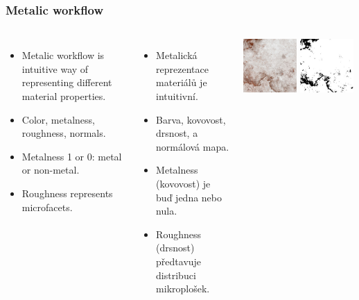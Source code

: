 \begin{frame}\frametitle{Metalic workflow}
  \begin{columns}[c]
    \scriptsize
    \begin{itemize}
      \item Metalic workflow is intuitive way of representing different material properties.
      \item Color, metalness, roughness, normals.
      \item Metalness 1 or 0: metal or non-metal.
      \item Roughness represents microfacets.
    \end{itemize}
    \begin{itemize}
      \item Metalická reprezentace materiálů je intuitivní.
      \item Barva, kovovost, drsnost, a normálová mapa.
      \item Metalness (kovovost) je buď jedna nebo nula.
      \item Roughness (drsnost) předtavuje distribuci mikroplošek.
    \end{itemize}
    \includegraphics[width=0.48\textwidth]{pics/physicallyBasedRendering/metal/color}
    \includegraphics[width=0.48\textwidth]{pics/physicallyBasedRendering/metal/metalness}

\end{columns}
\end{frame}
